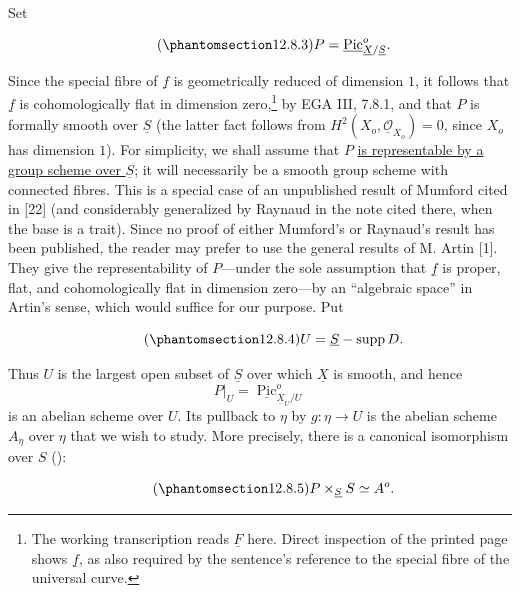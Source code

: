 \noindent
Set

\begin{equation}\tag{\SGARefTarget{sga7.sga7i.eix.n12-8-3}{12.8.3}}
 P=\underline{\operatorname{Pic}}^{o}_{\underline X/\underline S}.
\end{equation}

\noindent
Since the special fibre of $\underline f$ is geometrically reduced of
dimension $1$, it follows that $\underline f$ is cohomologically flat in
dimension zero,\footnote{The working transcription reads $\underline F$
here. Direct inspection of the printed page shows $\underline f$, as also
required by the sentence's reference to the special fibre of the universal
curve.} by EGA III, 7.8.1, and that $P$ is formally smooth over
$\underline S$ (the latter fact follows from
$H^2(X_o,\underline{\mathcal O}_{X_o})=0$, since $X_o$ has dimension $1$).
For simplicity, we shall assume that $P$ \underline{is representable by a
group scheme over $\underline S$}; it will necessarily be a smooth group
scheme with connected fibres. This is a special case of an unpublished
result of Mumford cited in [22] (and considerably generalized by Raynaud in
the note cited there, when the base is a trait). Since no proof of either
Mumford's or Raynaud's result has been published, the reader may prefer to
use the general results of M. Artin [1]. They give the representability of
$P$---under the sole assumption that $\underline f$ is proper, flat, and
cohomologically flat in dimension zero---by an ``algebraic space'' in
Artin's sense, which would suffice for our purpose. Put

\begin{equation}\tag{\SGARefTarget{sga7.sga7i.eix.n12-8-4}{12.8.4}}
 U=\underline S-\operatorname{supp}D.
\end{equation}

\noindent
Thus $U$ is the largest open subset of $\underline S$ over which
$\underline X$ is smooth, and hence
\[
 P|_U=\underline{\operatorname{Pic}}^{o}_{\underline X_U/U}
\]
is an abelian scheme over $U$. Its pullback to $\eta$ by
$g:\eta\longrightarrow U$ is the abelian scheme $A_\eta$ over $\eta$ that
we wish to study. More precisely, there is a canonical isomorphism over
$S$ ():

\begin{equation}\tag{\SGARefTarget{sga7.sga7i.eix.n12-8-5}{12.8.5}}
 P\times_{\underline S}S\simeq A^{o}.
\end{equation}

